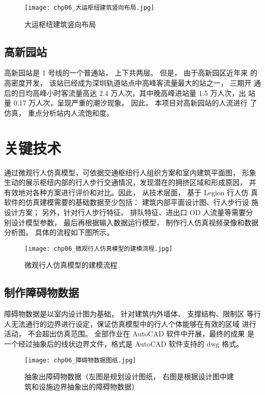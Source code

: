 \begin{figure}[!ht]
  \centering
  \texttt{[image: chp06\_大运枢纽建筑竖向布局.jpg]}
  \caption{大运枢纽建筑竖向布局\label{fig:chp06_大运枢纽建筑竖向布局} }
\end{figure}

\clearpage

\subsection{高新园站}
高新园站是 1 号线的一个普通站， 上下共两层。 但是， 由于高新园区近年来
的高密度开发， 该站已经成为深圳轨道站点中高峰客流量最大的站之一， 三期开
通后的日均高峰小时客流量高达 2.4 万人次，其中晚高峰进站量 1.5 万人次，出
站量 0.17 万人次，呈现严重的潮汐现象。 因此， 本项目对高新园站的人流进行
了仿真， 重点分析站内人流饱和度。

\section{关键技术}
通过微观行人仿真模型，可依据交通枢纽行人组织方案和室内建筑平面图，
形象生动的展示枢纽内部的行人步行交通情况，发现潜在的拥挤区域和形成原因，
并有效地对各种方案进行评价和对比。因此， 从技术层面， 基于 Legion 行人仿
真软件的仿真建模需要的基础数据至少包括： 建筑内部平面设计图、行人步行设
施设计方案； 另外，针对行人步行特征、 排队特征、进出口 OD 人流量等需要分
别设计模型参数， 最后再根据输入数据运行模型， 制作行人仿真视频录像和数据
分析图。 具体的流程如下图所示。

\begin{figure}[!ht]
  \centering
  \texttt{[image: chp06\_微观行人仿真模型的建模流程.jpg]}
  \caption{微观行人仿真模型的建模流程\label{fig:chp06_微观行人仿真模型的建模流程} }
\end{figure}

\subsection{制作障碍物数据}
障碍物数据是以室内设计图为基础， 针对建筑内外墙体、 支撑结构、限制区
等行人无法通行的边界进行设定，保证仿真模型中的行人个体能够在有效的区域
进行活动， 不会超出仿真范围。 全部作业在 AutoCAD 软件中开展，最终的成果
是一个经过抽象后的线状边界文件，格式是 AutoCAD 软件支持的 dwg 格式。

\begin{figure}[!ht]
  \centering
  \texttt{[image: chp06\_障碍物数据图纸.jpg]}
  \caption[抽象出障碍物数据]{抽象出障碍物数据（左图是规划设计图纸， 右图是根据设计图中建筑和设施边界抽象出的障碍物数据）\label{fig:chp06_障碍物数据图纸} }
\end{figure}

